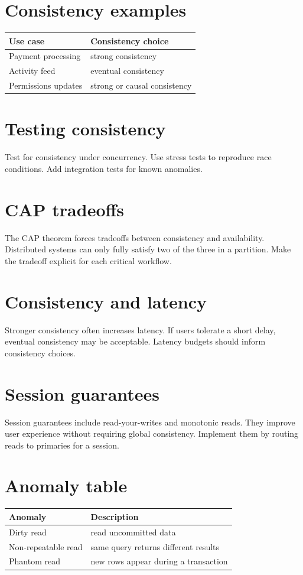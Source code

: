\section{Consistency examples}
\begin{tabularx}{\textwidth}{@{}lX@{}}
\toprule
Use case & Consistency choice \\
\midrule
Payment processing & strong consistency \\
Activity feed & eventual consistency \\
Permissions updates & strong or causal consistency \\
\bottomrule
\end{tabularx}

\section{Testing consistency}
Test for consistency under concurrency.
Use stress tests to reproduce race conditions.
Add integration tests for known anomalies.

\section{CAP tradeoffs}
The CAP theorem forces tradeoffs between consistency and availability.
Distributed systems can only fully satisfy two of the three in a partition.
Make the tradeoff explicit for each critical workflow.

\section{Consistency and latency}
Stronger consistency often increases latency.
If users tolerate a short delay, eventual consistency may be acceptable.
Latency budgets should inform consistency choices.

\section{Session guarantees}
Session guarantees include read-your-writes and monotonic reads.
They improve user experience without requiring global consistency.
Implement them by routing reads to primaries for a session.

\section{Anomaly table}
\begin{tabularx}{\textwidth}{@{}lX@{}}
\toprule
Anomaly & Description \\
\midrule
Dirty read & read uncommitted data \\
Non-repeatable read & same query returns different results \\
Phantom read & new rows appear during a transaction \\
\bottomrule
\end{tabularx}

